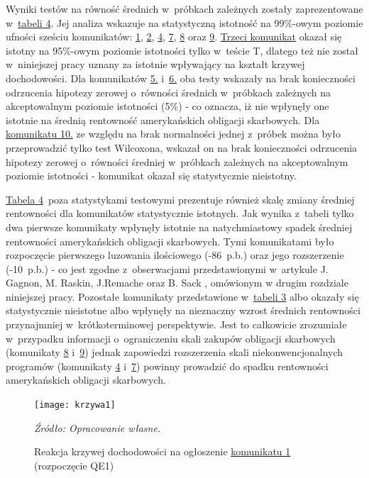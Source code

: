 Wyniki testów na równość średnich w~próbkach zależnych zostały zaprezentowane w~\hyperlink{tab3}{tabeli 4}. Jej analiza wskazuje na statystyczną istotność na 99\%-owym poziomie ufności sześciu komunikatów: \hyperlink{kom1}{1}, \hyperlink{kom2}{2}, \hyperlink{kom4}{4}, \hyperlink{kom7}{7}, \hyperlink{kom8}{8} oraz \hyperlink{kom9}{9}. \hyperlink{kom3}{Trzeci komunikat} okazał się istotny na 95\%-owym poziomie istotności tylko w~teście T, dlatego też nie został w~niniejszej pracy uznany za istotnie wpływający na kształt krzywej dochodowości. Dla komunikatów \hyperlink{kom5}{5.} i~\hyperlink{kom6}{6.} oba testy wskazały na brak konieczności odrzucenia hipotezy zerowej o~równości średnich w~próbkach zależnych na akceptowalnym poziomie istotności (5\%) - co oznacza, iż nie wpłynęły one istotnie na średnią rentowność amerykańskich obligacji skarbowych. Dla \hyperlink{kom10}{komunikatu 10.} ze względu na brak normalności jednej z~próbek można było przeprowadzić tylko test Wilcoxona, wskazał on na brak konieczności odrzucenia hipotezy zerowej o~równości średniej w~próbkach zależnych na akceptowalnym poziomie istotności - komunikat okazał się statystycznie nieistotny. 

\hyperlink{tab3}{Tabela 4}~poza statystykami testowymi prezentuje również skalę zmiany średniej rentowności dla komunikatów statystycznie istotnych. Jak wynika z~tabeli tylko dwa pierwsze komunikaty wpłynęły istotnie na natychmiastowy spadek średniej rentowności amerykańskich obligacji skarbowych. Tymi komunikatami było rozpoczęcie pierwszego luzowania ilościowego (-86~p.b.) oraz jego rozszerzenie (-10~p.b.) - co jest zgodne z~obserwacjami przedstawionymi w~artykule J. Gagnon, M. Raskin, J.Remache oraz B. Sack \cite{gagnon34}, omówionym w drugim rozdziale niniejszej pracy. Pozostałe komunikaty przedstawione w~\hyperlink{tab3}{tabeli 3} albo okazały się statystycznie nieistotne albo wpłynęły na nieznaczny wzrost średnich rentowności przynajmniej w~krótkoterminowej perspektywie. Jest to całkowicie zrozumiałe w~przypadku informacji o~ograniczeniu skali zakupów obligacji skarbowych (komunikaty \hyperlink{kom8}{8} i~\hyperlink{kom9}{9}) jednak zapowiedzi rozszerzenia skali niekonwencjonalnych programów (komunikaty \hyperlink{kom4}{4} i~\hyperlink{kom7}{7}) powinny prowadzić do spadku rentowności amerykańskich obligacji skarbowych. 

\vspace{0.25cm}
\hypertarget{fig4}{}
\begin{figure}[h]
\begin{centering}
  \texttt{[image: krzywa1]}
    \captionsetup{format=hang}
    \caption{Reakcja krzywej dochodowości na ogłoszenie \protect\hyperlink{kom1}{komunikatu 1} (rozpoczęcie QE1)}
\end{centering}
\begin{flushleft}
\hspace{1cm}\textit{\footnotesize{Źródło: Opracowanie własne.}} \\
\end{flushleft}
\vspace{-0.5cm}
\end{figure}

